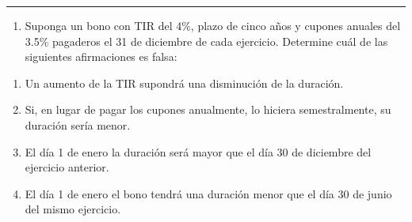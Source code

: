 \documentclass[
  letterpaper,
  DIV=11,
  numbers=noendperiod]{scrartcl}
\providecommand{\tightlist}{%
  \setlength{\itemsep}{0pt}\setlength{\parskip}{0pt}}\usepackage{longtable,booktabs,array}
\begin{document}
\begin{center}\rule{0.5\linewidth}{0.5pt}\end{center}

\begin{enumerate}
\def\labelenumi{\arabic{enumi}.}
\setcounter{enumi}{4}
\tightlist
\item
  Suponga un bono con TIR del 4\%, plazo de cinco años y cupones anuales
  del 3.5\% pagaderos el 31 de diciembre de cada ejercicio. Determine
  cuál de las siguientes afirmaciones es falsa:
\end{enumerate}

\begin{enumerate}
\def\labelenumi{\alph{enumi}.}
\item
  Un aumento de la TIR supondrá una disminución de la duración.
\item
  Si, en lugar de pagar los cupones anualmente, lo hiciera
  semestralmente, su duración sería menor.
\item
  El día 1 de enero la duración será mayor que el día 30 de diciembre
  del ejercicio anterior.
\item
  El día 1 de enero el bono tendrá una duración menor que el día 30 de
  junio del mismo ejercicio.
\end{enumerate}
\end{document}
